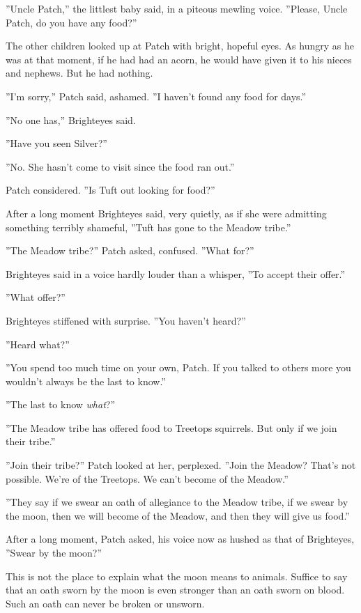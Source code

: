 \documentclass[11pt]{article}
\begin{document}
 ''Uncle Patch,'' the littlest baby said, in a piteous mewling voice. ''Please, Uncle Patch, do you have any food?''\par
 The other children looked up at Patch with bright, hopeful eyes. As hungry as he was at that moment, if he had had an acorn, he would have given it to his nieces and nephews. But he had nothing.\par
''I'm sorry,'' Patch said, ashamed. ''I haven't found any food for days.''\par
 ''No one has,'' Brighteyes said.\par
 ''Have you seen Silver?''\par
 ''No. She hasn't come to visit since the food ran out.''\par
 Patch considered. ''Is Tuft out looking for food?''\par
 After a long moment Brighteyes said, very quietly, as if she were admitting something terribly shameful, ''Tuft has gone to the Meadow tribe.''\par
 ''The Meadow tribe?'' Patch asked, confused. ''What for?''\par
 Brighteyes said in a voice hardly louder than a whisper, ''To accept their offer.''\par
 ''What offer?''\par
 Brighteyes stiffened with surprise. ''You haven't heard?''\par
 ''Heard what?''\par
 ''You spend too much time on your own, Patch. If you talked to others more you wouldn't always be the last to know.''\par
 ''The last to know {\it what}?''\par
 ''The Meadow tribe has offered food to Treetops squirrels. But only if we join their tribe.''\par
 ''Join their tribe?'' Patch looked at her, perplexed. ''Join the Meadow? That's not possible. We're of the Treetops. We can't become of the Meadow.''\par
 ''They say if we swear an oath of allegiance to the Meadow tribe, if we swear by the moon, then we will become of the Meadow, and then they will give us food.''\par
 After a long moment, Patch asked, his voice now as hushed as that of Brighteyes, ''Swear by the moon?''\par
This is not the place to explain what the moon means to animals. Suffice to say that an oath sworn by the moon is even stronger than an oath sworn on blood. Such an oath can never be broken or unsworn.\par
\end{document}
